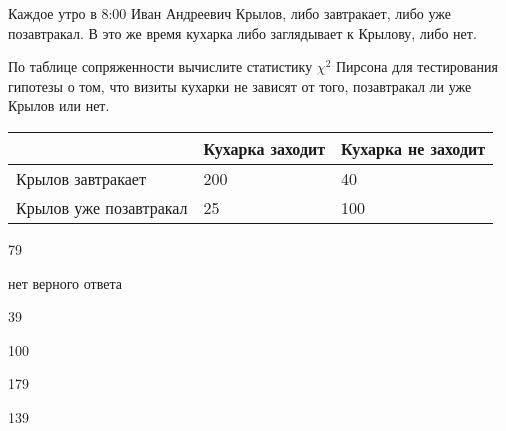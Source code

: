
\begin{question}
Каждое утро в 8:00 Иван Андреевич Крылов, либо завтракает, либо уже
позавтракал. В это же время кухарка либо заглядывает к Крылову, либо
нет.

По таблице сопряженности вычислите статистику \(\chi^2\) Пирсона для
тестирования гипотезы о том, что визиты кухарки не зависят от того,
позавтракал ли уже Крылов или нет.

\begin{longtable}[]{@{}lll@{}}
\toprule
& Кухарка заходит & Кухарка не заходит \\
\midrule
\endhead
Крылов завтракает & 200 & 40 \\
Крылов уже позавтракал & 25 & 100 \\
\bottomrule
\end{longtable}
\begin{answerlist}
  \item 79
  \item нет верного ответа
  \item 39
  \item 100
  \item 179
  \item 139
\end{answerlist}
\end{question}


